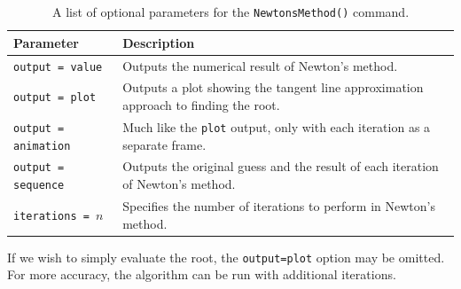 
\begin{table}
\label{tbl:newtonsmethod_options}
\centering
\begin{tabular}{lp{2.5in}}
\hline
Parameter & Description\\
\hline
\texttt{output = value}			& Outputs the numerical result of Newton's method.\\
\texttt{output = plot}			& Outputs a plot showing the tangent line approximation approach to finding the root.\\
\texttt{output = animation}		& Much like the \texttt{plot} output, only with each iteration as a separate frame.\\
\texttt{output = sequence}		& Outputs the original guess and the result of each iteration of Newton's method.\\
\texttt{iterations = }$n$		& Specifies the number of iterations to perform in Newton's method.\\
\hline
\end{tabular}
\caption{A list of optional parameters for the \texttt{NewtonsMethod()} command.}
\end{table}

\clearpage

\begin{maplegroup}
\begin{mapleinput}
\end{mapleinput}
\end{maplegroup}


\begin{maplegroup}
\begin{mapleinput}
\end{mapleinput}
\mapleresult
{}
\end{maplegroup}

If we wish to simply evaluate the root, the \texttt{output=plot} option may be omitted. For more accuracy, the algorithm can be run with additional iterations.


\begin{maplegroup}
\begin{mapleinput}
\end{mapleinput}
\mapleresult
\begin{maplelatex}
\end{maplelatex}
\end{maplegroup}

